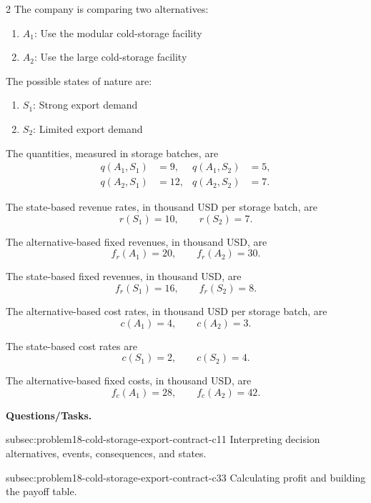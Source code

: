 \begin{multicols}{2}
	The company is comparing two alternatives:
	\begin{enumerate}[label=\arabic*.]
		\item \(A_1\): Use the modular cold-storage facility
		\item \(A_2\): Use the large cold-storage facility
	\end{enumerate}
	
	The possible states of nature are:
	\begin{enumerate}[label=\arabic*.]
		\item \(S_1\): Strong export demand
		\item \(S_2\): Limited export demand
	\end{enumerate}
	
	\columnbreak
	
	The quantities, measured in storage batches, are
	\[
	\begin{aligned}
		q(A_1,S_1)&=9,
		&
		q(A_1,S_2)&=5,
		\\
		q(A_2,S_1)&=12,
		&
		q(A_2,S_2)&=7.
	\end{aligned}
	\]
	
	The state-based revenue rates, in thousand USD per storage batch, are
	\[
	r(S_1)=10,
	\qquad
	r(S_2)=7.
	\]
	
	The alternative-based fixed revenues, in thousand USD, are
	\[
	f_r(A_1)=20,
	\qquad
	f_r(A_2)=30.
	\]
	
	The state-based fixed revenues, in thousand USD, are
	\[
	f_r(S_1)=16,
	\qquad
	f_r(S_2)=8.
	\]
	
	The alternative-based cost rates, in thousand USD per storage batch, are
	\[
	c(A_1)=4,
	\qquad
	c(A_2)=3.
	\]
	
	The state-based cost rates are
	\[
	c(S_1)=2,
	\qquad
	c(S_2)=4.
	\]
	
	The alternative-based fixed costs, in thousand USD, are
	\[
	f_c(A_1)=28,
	\qquad
	f_c(A_2)=42.
	\]
\end{multicols}

\textbf{Questions/Tasks.}
\begin{enumerate}
	\CriterionTask
	{subsec:problem18-cold-storage-export-contract-c1}{1}
	{Interpreting decision alternatives, events, consequences, and states.}

	\CriterionTask
	{subsec:problem18-cold-storage-export-contract-c3}{3}
	{Calculating profit and building the payoff table.}
\end{enumerate}

